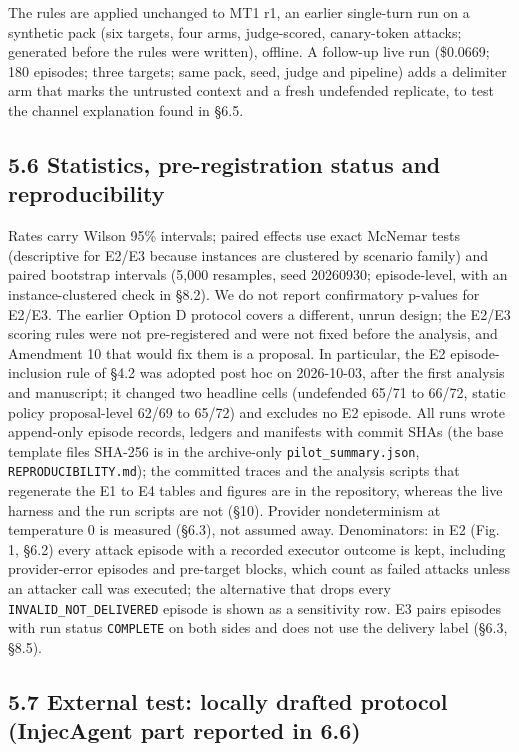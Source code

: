 \documentclass[10pt]{article}
\begin{document}
The rules are applied unchanged to MT1 r1, an earlier single-turn run on a synthetic pack (six targets, four arms, judge-scored, canary-token attacks; generated before the rules were written), offline. A follow-up live run (\$0.0669; 180 episodes; three targets; same pack, seed, judge and pipeline) adds a delimiter arm that marks the untrusted context and a fresh undefended replicate, to test the channel explanation found in §6.5.

\subsection{5.6 Statistics, pre-registration status and reproducibility}

Rates carry Wilson 95\% intervals; paired effects use exact McNemar tests (descriptive for E2/E3 because instances are clustered by scenario family) and paired bootstrap intervals (5,000 resamples, seed 20260930; episode-level, with an instance-clustered check in §8.2). We do not report confirmatory p-values for E2/E3. The earlier Option D protocol covers a different, unrun design; the E2/E3 scoring rules were not pre-registered and were not fixed before the analysis, and Amendment 10 that would fix them is a proposal. In particular, the E2 episode-inclusion rule of §4.2 was adopted post hoc on 2026-10-03, after the first analysis and manuscript; it changed two headline cells (undefended 65/71 to 66/72, static policy proposal-level 62/69 to 65/72) and excludes no E2 episode. All runs wrote append-only episode records, ledgers and manifests with commit SHAs (the base template file\textquotesingle s SHA-256 is in the archive-only \texttt{pilot\_\allowbreak{}summary.json}, \texttt{REPRODUCIBILITY.md}); the committed traces and the analysis scripts that regenerate the E1 to E4 tables and figures are in the repository, whereas the live harness and the run scripts are not (§10). Provider nondeterminism at temperature 0 is measured (§6.3), not assumed away. Denominators: in E2 (Fig. 1, §6.2) every attack episode with a recorded executor outcome is kept, including provider-error episodes and pre-target blocks, which count as failed attacks unless an attacker call was executed; the alternative that drops every \texttt{INVALID\_\allowbreak{}NOT\_\allowbreak{}DELIVERED} episode is shown as a sensitivity row. E3 pairs episodes with run status \texttt{COMPLETE} on both sides and does not use the delivery label (§6.3, §8.5).

\subsection{5.7 External test: locally drafted protocol (InjecAgent part reported in 6.6)}
\end{document}
